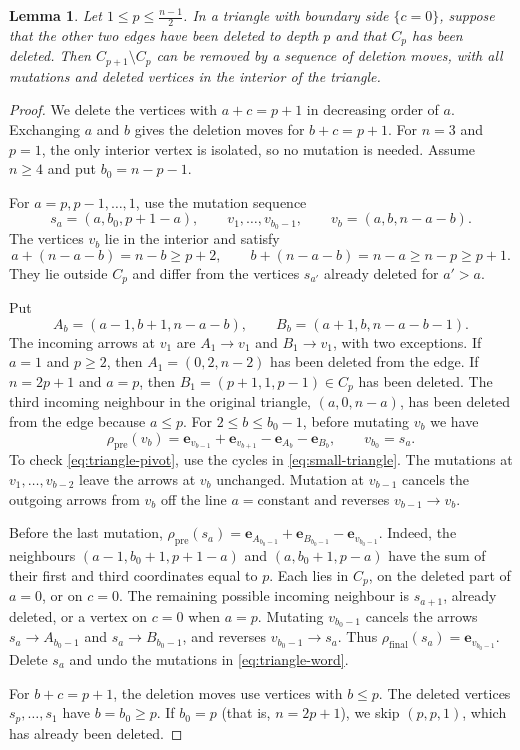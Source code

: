 \documentclass[12pt, letter]{amsart}
\newtheorem{lemma}[theorem]{Lemma}
\theoremstyle{definition}
\numberwithin{equation}{section}
\begin{document}
\begin{lemma}\label{lem:triangle-shell}
Let $1 \le p \le \frac{n-1}{2}$.
In a triangle with boundary side $\{c=0\}$, suppose that the other
two edges have been deleted to depth $p$ and that $C_p$ has been deleted.
Then $C_{p+1}\setminus C_p$ can be removed by a sequence of deletion moves,
with all mutations and deleted vertices in the interior of the triangle.
\end{lemma}
\begin{proof}
We delete the vertices with $a+c=p+1$
in decreasing order of $a$.
Exchanging $a$ and $b$ gives the deletion moves for $b+c=p+1$.
For $n=3$ and $p=1$, the only interior vertex is isolated,
so no mutation is needed. Assume $n \ge 4$ and put $b_0=n-p-1$.

For $a=p,p-1,\ldots,1$, use the mutation sequence
\begin{equation}\label{eq:triangle-word}
 s_a=(a,b_0,p+1-a),\qquad
 v_1,\ldots,v_{b_0-1},\qquad v_b=(a,b,n-a-b).
\end{equation}
The vertices $v_b$ lie in the interior and satisfy
\[
 a+(n-a-b)=n-b\ge p+2,\qquad
 b+(n-a-b)=n-a\ge n-p\ge p+1.
\]
They lie outside $C_p$ and differ from the vertices $s_{a'}$ already deleted for $a'>a$.

Put
\[
 A_b=(a-1,b+1,n-a-b),\qquad
 B_b=(a+1,b,n-a-b-1).
\]
The incoming arrows at $v_1$ are $A_1\to v_1$ and $B_1\to v_1$,
with two exceptions. If $a=1$ and $p\ge2$, then
$A_1=(0,2,n-2)$ has been deleted from the edge.
If $n=2p+1$ and $a=p$, then $B_1=(p+1,1,p-1)\in C_p$
has been deleted. The third incoming neighbour in the original triangle,
$(a,0,n-a)$, has been deleted from the edge because $a\le p$.
For $2\le b\le b_0-1$,  before mutating $v_b$ we have
\begin{equation}\label{eq:triangle-pivot}
 \rho_{\mathrm{pre}}(v_b)
 =\mathbf e_{v_{b-1}}+\mathbf e_{v_{b+1}}
  -\mathbf e_{A_b}-\mathbf e_{B_b},
 \qquad v_{b_0}=s_a.
\end{equation}
To check \eqref{eq:triangle-pivot}, use the cycles in \eqref{eq:small-triangle}.
The mutations at $v_1,\ldots,v_{b-2}$ leave the arrows at $v_b$ unchanged.
Mutation at $v_{b-1}$ cancels the outgoing arrows from $v_b$
off the line $a=\mathrm{constant}$ and reverses $v_{b-1}\to v_b$.

Before the last mutation,
$
 \rho_{\mathrm{pre}}(s_a)=\mathbf e_{A_{b_0-1}}+\mathbf e_{B_{b_0-1}}
                  -\mathbf e_{v_{b_0-1}}.
$
Indeed, the neighbours
$
 (a-1,b_0+1,p+1-a)$ and $(a,b_0+1,p-a)$
have the sum of their first and third coordinates equal to $p$.
Each lies in $C_p$, on the deleted part of $a=0$, or on $c=0$.
The remaining possible incoming neighbour is $s_{a+1}$, already deleted,
or a vertex on $c=0$ when $a=p$.
Mutating $v_{b_0-1}$ cancels the arrows
$s_a\to A_{b_0-1}$ and $s_a\to B_{b_0-1}$, and reverses
$v_{b_0-1}\to s_a$. Thus
$
 \rho_{\mathrm{final}}(s_a)=\mathbf e_{v_{b_0-1}}.
$
Delete $s_a$ and undo the mutations in \eqref{eq:triangle-word}.

For $b+c=p+1$, the deletion moves use vertices with $b\le p$.
The deleted vertices $s_p,\ldots,s_1$ have $b=b_0\ge p$.
If $b_0=p$ (that is, $n=2p+1$), we skip $(p,p,1)$,
which has already been deleted.
\end{proof}
\end{document}
